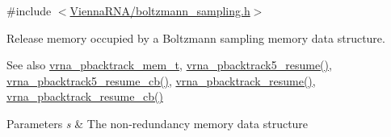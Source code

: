 {\ttfamily \#include $<$\mbox{\hyperlink{boltzmann__sampling_8h}{Vienna\+R\+N\+A/boltzmann\+\_\+sampling.\+h}}$>$}



Release memory occupied by a Boltzmann sampling memory data structure. 

\begin{DoxySeeAlso}{See also}
\mbox{\hyperlink{group__subopt__stochbt_gaa59c30efbed96bf9aaf8005584c72e63}{vrna\+\_\+pbacktrack\+\_\+mem\+\_\+t}}, \mbox{\hyperlink{group__subopt__stochbt_gac5d7065196975b803daeb4e094ba1cb9}{vrna\+\_\+pbacktrack5\+\_\+resume()}}, \mbox{\hyperlink{group__subopt__stochbt_ga4a91dc092580faf7799476e8dd76e0ac}{vrna\+\_\+pbacktrack5\+\_\+resume\+\_\+cb()}}, \mbox{\hyperlink{group__subopt__stochbt_gae175129ece546fe7c092f27072e039d1}{vrna\+\_\+pbacktrack\+\_\+resume()}}, \mbox{\hyperlink{group__subopt__stochbt_ga6fc5ce952995e53baef52cad5581c063}{vrna\+\_\+pbacktrack\+\_\+resume\+\_\+cb()}}
\end{DoxySeeAlso}

\begin{DoxyParams}{Parameters}
{\em s} & The non-\/redundancy memory data structure \\
\hline
\end{DoxyParams}
